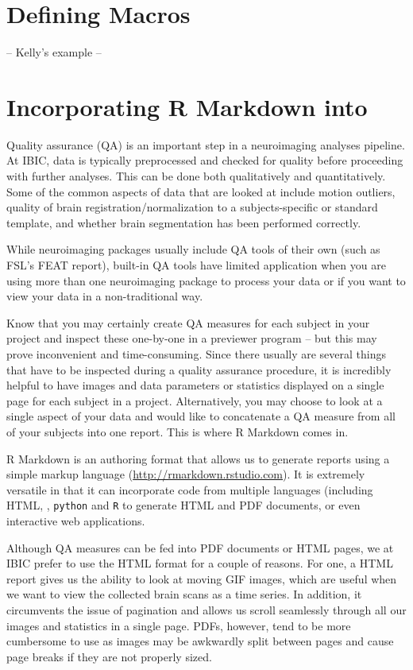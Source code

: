 \section{Defining Macros}
-- Kelly's example --


\section{Incorporating R Markdown into \maken{}}

Quality assurance (QA) is an important step in a neuroimaging analyses pipeline. At IBIC, data is typically preprocessed and checked for quality before proceeding with further analyses. This can be done both qualitatively and quantitatively. Some of the common aspects of data that are looked at include motion outliers, quality of brain registration/normalization to a subjects-specific or standard template, and whether brain segmentation has been performed correctly. 

While neuroimaging packages usually include QA tools of their own (such as FSL's FEAT report), built-in QA tools have limited application when you are using more than one neuroimaging package to process your data or if you want to view your data in a non-traditional way. 

Know that you may certainly create QA measures for each subject in your project and inspect these one-by-one in a previewer program -- but this may prove inconvenient and time-consuming. Since there usually are several things that have to be inspected during a quality assurance procedure, it is incredibly helpful to have images and data parameters or statistics displayed on a single page for each subject in a project. Alternatively, you may choose to look at a single aspect of your data and would like to concatenate a QA measure from all of your subjects into one report. This is where R Markdown comes in.

R Markdown is an authoring format that allows us to generate reports using a simple markup language (\url{http://rmarkdown.rstudio.com}). It is extremely versatile in that it can incorporate code from multiple languages (including HTML, \bashn{}, \texttt{python} and \texttt{R} to generate HTML and PDF documents, or even interactive web applications. 

Although QA measures can be fed into PDF documents or HTML pages, we at IBIC prefer to use the HTML format for a couple of reasons. For one, a HTML report gives us the ability to look at moving GIF images, which are useful when we want to view the collected brain scans as a time series. In addition, it circumvents the issue of pagination and allows us scroll seamlessly through all our images and statistics in a single page. PDFs, however, tend to be more cumbersome to use as images may be awkwardly split between pages and cause page breaks if they are not properly sized.

